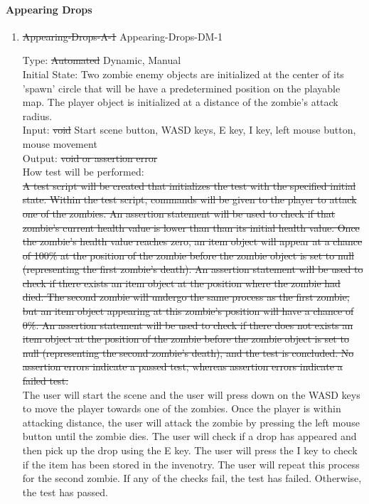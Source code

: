 \documentclass[12pt, titlepage]{article}
\newcounter{ftnum}
\begin{document}
\paragraph{Appearing Drops}

\begin{enumerate}

\item{\sout{Appearing-Drops-A-1} {\color{magenta} Appearing-Drops-DM-1}\\}  \label{F8-1}

Type: \sout{Automated} {\color{magenta} Dynamic, Manual}\\
					
Initial State: Two zombie enemy objects are initialized at the center of its 'spawn' circle that will be have a predetermined position on the playable map. The player object is initialized at a distance of the zombie's attack radius.\\
					
Input: \sout{void} {\color{magenta} Start scene button, WASD keys, E key, I key, left mouse button, mouse movement}\\
					
Output: \sout{void or assertion error} {\color{magenta} }\\
					
How test will be performed:\\ \sout{A test script will be created that initializes the test with the specified initial state. Within the test script, commands will be given to the player to attack one of the zombies. An assertion statement will be used to check if that zombie's current health value is lower than than its initial health value. Once the zombie's health value reaches zero, an item object will appear at a chance of 100\% at the position of the zombie before the zombie object is set to null (representing the first zombie's death). An assertion statement will be used to check if there exists an item object at the position where the zombie had died. The second zombie will undergo the same process as the first zombie, but an item object appearing at this zombie's position will have a chance of 0\%. An assertion statement will be used to check if there does not exists an item object at the position of the zombie before the zombie object is set to null (representing the second zombie's death), and the test is concluded. No assertion errors indicate a passed test, whereas assertion errors indicate a failed test.}\\
{\color{magenta} The user will start the scene and the user will press down on the WASD keys to move the player towards one of the zombies. Once the player is within attacking distance, the user will attack the zombie by pressing the left mouse button until the zombie dies. The user will check if a drop has appeared and then pick up the drop using the E key. The user will press the I key to check if the item has been stored in the invenotry. The user will repeat this process for the second zombie. If any of the checks fail, the test has failed. Otherwise, the test has passed.}\\

\end{enumerate}
\end{document}
